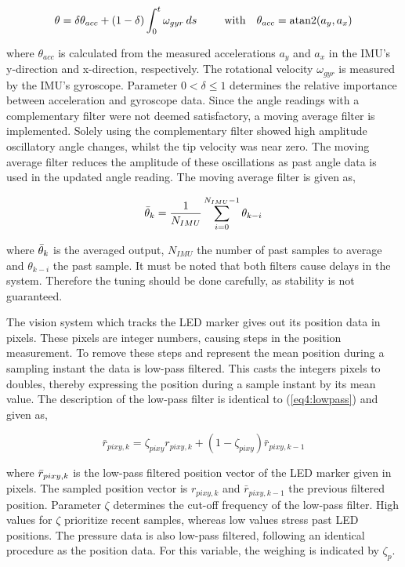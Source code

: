 \begin{equation}
    \theta = \delta \theta_{acc} + (1-\delta) \int_0^t \omega_{gyr} \hspace{2pt} ds    \hspace{25pt} \text{with}  \hspace{10pt} \theta_{acc} = \operatorname{atan2}(a_y,a_x)
\end{equation}

where $\theta_{acc}$ is calculated from the measured accelerations $a_y$ and $a_x$ in the IMU's y-direction and x-direction, respectively. The rotational velocity $\omega_{gyr}$ is measured by the IMU's gyroscope. Parameter $0 < \delta \leq 1$ determines the relative importance between acceleration and gyroscope data. Since the angle readings with a complementary filter were not deemed satisfactory, a moving average filter is implemented. Solely using the complementary filter showed high amplitude oscillatory angle changes, whilst the tip velocity was near zero. The moving average filter reduces the amplitude of these oscillations as past angle data is used in the updated angle reading. The moving average filter is given as,

\begin{equation}
    \Bar{\theta}_k = \frac{1}{N_{IMU}}\sum_{i = 0} ^ {N_{IMU}-1} \theta_{k-i}
\end{equation}

where $\Bar{\theta}_k$ is the averaged output, $N_{IMU}$ the number of past samples to average and $\theta_{k-i}$ the past sample. It must be noted that both filters cause delays in the system. Therefore the tuning should be done carefully, as stability is not guaranteed.

The vision system which tracks the LED marker gives out its position data in pixels. These pixels are integer numbers, causing steps in the position measurement. To remove these steps and represent the mean position during a sampling instant the data is low-pass filtered. This casts the integers pixels to doubles, thereby expressing the position during a sample instant by its mean value. The description of the low-pass filter is identical to (\ref{eq4:lowpass}) and given as,

\begin{equation}
\bar{r}_{pixy,k} = \zeta_{pixy} r_{pixy,k} + (1-\zeta_{pixy})\bar{r}_{pixy,k-1}
\label{eq5:lowpass}
\end{equation}

where $\Bar{r}_{pixy,k}$ is the low-pass filtered position vector of the LED marker given in pixels. The sampled position vector is $r_{pixy,k}$ and $\bar{r}_{pixy,k-1}$ the previous filtered position. Parameter $\zeta$ determines the cut-off frequency of the low-pass filter. High values for $\zeta$ prioritize recent samples, whereas low values stress past LED positions. The pressure data is also low-pass filtered, following an identical procedure as the position data. For this variable, the weighing is indicated by $\zeta_p$. 





